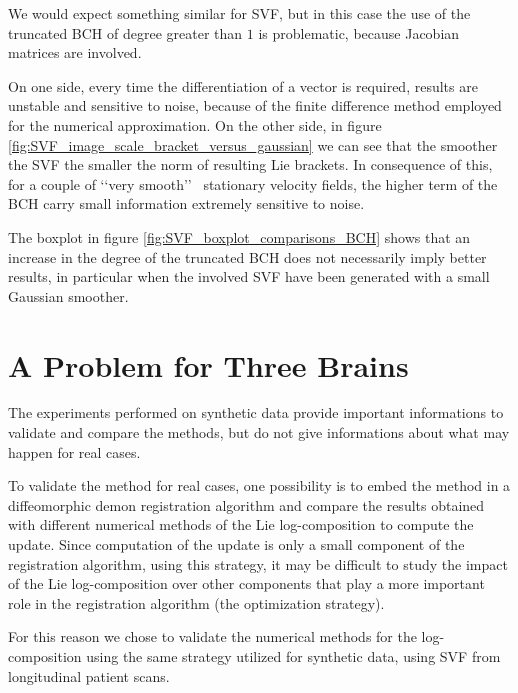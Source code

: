 We would expect something similar for SVF, but in this case the use of the truncated BCH of degree greater than $1$ is problematic, because Jacobian matrices are involved.

On one side, every time the differentiation of a vector is required, results are unstable and sensitive to noise, because of the finite difference method employed for the numerical approximation. On the other side, in figure \ref{fig:SVF_image_scale_bracket_versus_gaussian} we can see that the smoother the SVF the smaller the norm of resulting Lie brackets. In consequence of this, for a couple of \lq\lq very smooth\rq\rq~ stationary velocity fields, the higher term of the BCH carry small information extremely sensitive to noise.

The boxplot in figure \ref{fig:SVF_boxplot_comparisons_BCH} shows that an increase in the degree of the truncated BCH does not necessarily imply better results, in particular when the involved SVF have been generated with a small Gaussian smoother.


\section{A Problem for Three Brains}\label{se:three_brains} %
The experiments performed on synthetic data provide important informations to validate and compare the methods, but do not give informations about what may happen for real cases. 

To validate the method for real cases, one possibility is to embed the method in a diffeomorphic demon registration algorithm and compare the results obtained with different numerical methods of the Lie log-composition to compute the update. Since computation of the update is only a small component of the registration algorithm, using this strategy, it may be difficult to study the impact of the Lie log-composition over other components that play a more important role in the registration algorithm (the optimization strategy).

For this reason we chose to validate the numerical methods for the log-composition using the same strategy utilized for synthetic data, using SVF from longitudinal patient scans.

